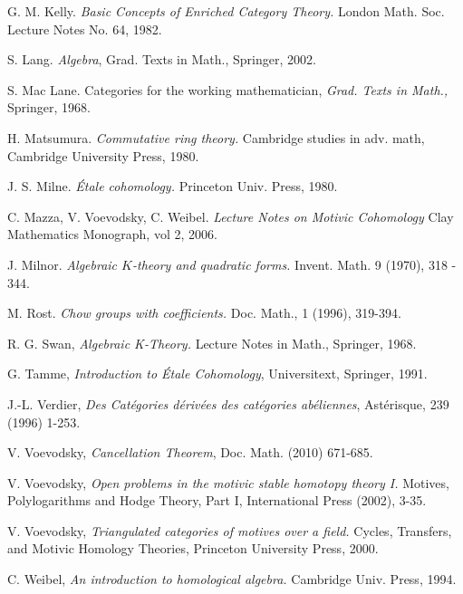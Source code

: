 \begin{thebibliography}{10}
G. M. Kelly.
\emph{Basic Concepts of Enriched Category Theory.}
London Math. Soc. Lecture Notes No. 64, 1982.

S. Lang.
\emph{Algebra}, Grad. Texts in Math.,
Springer, 2002.

S. Mac Lane.
Categories for the working mathematician, 
{\em Grad. Texts in Math.,} Springer, 1968.

H. Matsumura.
\emph{Commutative ring theory.}
Cambridge studies in adv. math,
Cambridge University Press, 1980.

J. S. Milne.
\emph{\'Etale cohomology.} 
Princeton Univ. Press, 1980.

C. Mazza, V. Voevodsky, C. Weibel.
\emph{Lecture Notes on Motivic Cohomology}
Clay Mathematics Monograph, vol 2, 2006.

J. Milnor.
\emph{Algebraic $K$-theory and quadratic forms.}
Invent. Math. 9 (1970), 318 - 344.

M. Rost.
\emph{Chow groups with coefficients.}
Doc. Math., 1 (1996), 319-394.

R. G. Swan,
\emph{Algebraic K-Theory.}
Lecture Notes in Math.,
Springer, 1968.

G. Tamme,
\emph{Introduction to \'Etale Cohomology},
Universitext,
Springer, 1991.

J.-L. Verdier, \emph{Des Cat\'egories d\'eriv\'ees des cat\'egories
ab\'eliennes},
Ast\'erisque, 239 (1996) 1-253.

V. Voevodsky,
\emph{Cancellation Theorem},
Doc. Math. (2010) 671-685.

V. Voevodsky,
{\em Open problems in the motivic stable homotopy theory I.}
Motives, Polylogarithms and Hodge Theory, Part I,
International Press (2002), 3-35.

V. Voevodsky,
\emph{Triangulated categories of motives over a field.}
Cycles, Transfers, and Motivic Homology Theories,
Princeton University Press, 2000.

C. Weibel,
\emph{An introduction to homological algebra.}
Cambridge Univ. Press, 1994.
\end{thebibliography}
